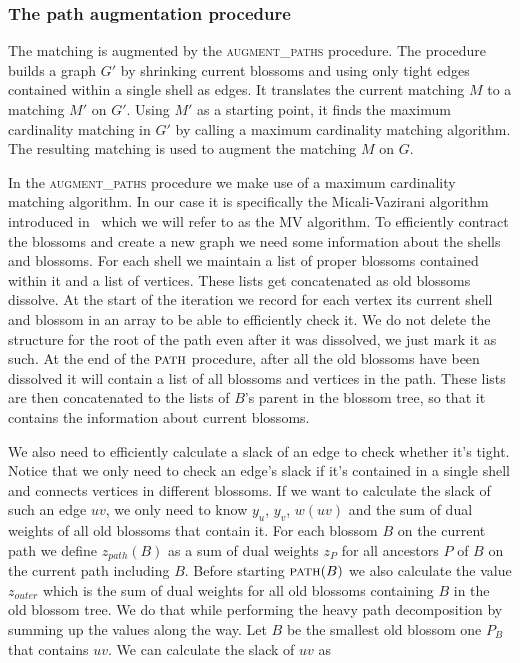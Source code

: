 \subsubsection{The path augmentation procedure}

The matching is augmented by the \textsc{augment\_paths} procedure. The procedure builds a graph $G'$ by shrinking current blossoms and using only tight edges contained within a single shell as edges. It translates the current matching $M$ to a matching $M'$ on $G'$. Using $M'$ as a starting point, it finds the maximum cardinality matching in $G'$ by calling a maximum cardinality matching algorithm. The resulting matching is used to augment the matching $M$ on $G$.

In the \textsc{augment\_paths} procedure we make use of a maximum cardinality matching algorithm. In our case it is specifically the Micali-Vazirani algorithm introduced in~\cite{micali1980v} which we will refer to as the MV algorithm. To efficiently contract the blossoms and create a new graph we need some information about the shells and blossoms. For each shell we maintain a list of proper blossoms contained within it and a list of vertices. These lists get concatenated as old blossoms dissolve. At the start of the iteration we record for each vertex its current shell and blossom in an array to be able to efficiently check it. We do not delete the structure for the root of the path even after it was dissolved, we just mark it as such. At the end of the $\textsc{path}$ procedure, after all the old blossoms have been dissolved it will contain a list of all blossoms and vertices in the path. These lists are then concatenated to the lists of $B$'s parent in the blossom tree, so that it contains the information about current blossoms.

We also need to efficiently calculate a slack of an edge to check whether it's tight. Notice that we only need to check an edge's slack if it's contained in a single shell and connects vertices in different blossoms. If we want to calculate the slack of such an edge $uv$, we only need to know $y_u$, $y_v$, $w(uv)$ and the sum of dual weights of all old blossoms that contain it. For each blossom $B$ on the current path we define $z_{path}(B)$ as a sum of dual weights $z_P$ for all ancestors $P$ of $B$ on the current path including $B$. Before starting $\textsc{path}(B)$ we also calculate the value $z_{outer}$ which is the sum of dual weights for all old blossoms containing $B$ in the old blossom tree. We do that while performing the heavy path decomposition by summing up the values along the way. Let $B$ be the smallest old blossom one $P_B$ that contains $uv$. We can calculate the slack of $uv$ as

